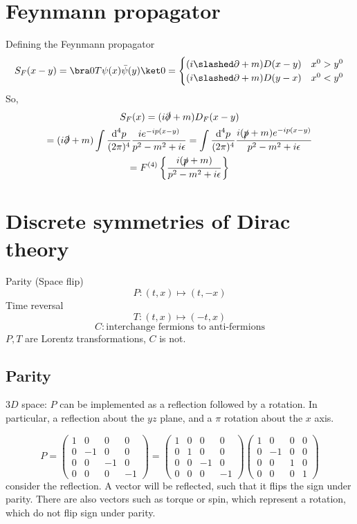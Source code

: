 \documentclass[]{scrartcl}
\begin{document}
\section{Feynmann propagator}
Defining the Feynmann propagator
\begin{equation}
	S_F(x-y) = \bra0 T\psi(x)\bar\psi(y)\ket0 =
	\begin{cases}
		(i\slashed\partial + m)D(x-y) & x^0 > y^0\\
		(i\slashed\partial + m)D(y-x) & x^0 < y^0
	\end{cases}
\end{equation}
So,
\begin{gather}
	S_F(x) = (i\slashed\partial + m) D_F(x-y)\\
	= (i\slashed\partial + m) \int\frac{\text d^4p}{(2\pi)^4}\frac{ie^{-ip(x-y)}}{p^2 - m^2 + i\epsilon} = \int\frac{\text d^4p}{(2\pi)^4}\frac{i(\slashed p + m)e^{-ip(x-y)}}{p^2 - m^2 + i\epsilon}\\
	= F^{(4)}\left\{\frac{i(\slashed p + m)}{p^2 - m^2 + i\epsilon}\right\}
\end{gather}

\section{Discrete symmetries of Dirac theory}
Parity (Space flip)
$$
P: (t,x) \mapsto (t,-x)
$$
Time reversal
$$
T: (t,x)\mapsto(-t,x)
$$
$$
C: \text{interchange fermions to anti-fermions}
$$
$P, T$ are Lorentz transformations, $C$ is not.

\subsection{Parity}
$3D$ space: $P$ can be implemented as a reflection followed by a rotation. In particular, a reflection about the $yz$ plane, and a $\pi$ rotation about the $x$ axis.

$$
P = 
\begin{pmatrix}
	1 & 0 & 0 & 0\\
	0 & -1 & 0 & 0\\
	0 & 0 & -1 & 0\\
	0 & 0 & 0 & -1
\end{pmatrix} =
\begin{pmatrix}
	1 & 0 & 0 & 0\\
	0 & 1 & 0 & 0\\
	0 & 0 & -1 & 0\\
	0 & 0 & 0 & -1
\end{pmatrix}
\begin{pmatrix}
	1 & 0 & 0 & 0\\
	0 & -1 & 0 & 0\\
	0 & 0 & 1 & 0\\
	0 & 0 & 0 & 1
\end{pmatrix}
$$
consider the reflection. A vector will be reflected, such that it flips the sign under parity. There are also vectors such as torque or spin, which represent a rotation, which do not flip sign under parity. 
\end{document}

